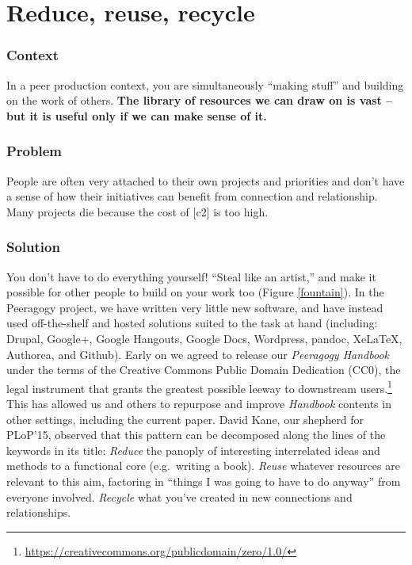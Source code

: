 \section{Reduce, reuse, recycle} \label{sec:Reduce, reuse, recycle}

\subsubsection*{Context}
In a peer production context, you are simultaneously ``making stuff'' and building on the work of others. 
\textbf{The library of resources we can draw on is vast -- but it is useful only if we can make sense of it.}


\subsubsection*{Problem}
People are often very attached to their own projects and priorities and don't have a sense of how their initiatives can benefit from connection and relationship.  Many projects die because the cost of  [c2] is too high.

\subsubsection*{Solution} You don't have to do everything yourself!  ``Steal like an artist,'' and make it possible for other people to build on your work too (Figure \ref{fountain}).  In the Peeragogy project, we have written very little new software, and have instead used off-the-shelf and hosted solutions suited to the task at hand (including: Drupal, Google+, Google Hangouts, Google Docs, Wordpress, pandoc, XeLaTeX, Authorea, and Github).  Early on we agreed to release our \emph{Peeragogy Handbook} under the terms of the Creative Commons Public Domain Dedication (CC0), the legal instrument that grants the greatest possible leeway to downstream users.\footnote{\url{https://creativecommons.org/publicdomain/zero/1.0/}}  This has allowed us and others to repurpose and improve \emph{Handbook} contents in other settings, including the current paper.  David Kane, our shepherd for PLoP'15, observed that this pattern can be decomposed along the lines of the keywords in its title:  \emph{Reduce} the panoply of interesting interrelated ideas and methods to a functional core (e.g.~writing a book).  \emph{Reuse} whatever resources are relevant to this aim, factoring in ``things I was going to have to do anyway'' from everyone involved.  \emph{Recycle} what you've created in new connections and relationships.

